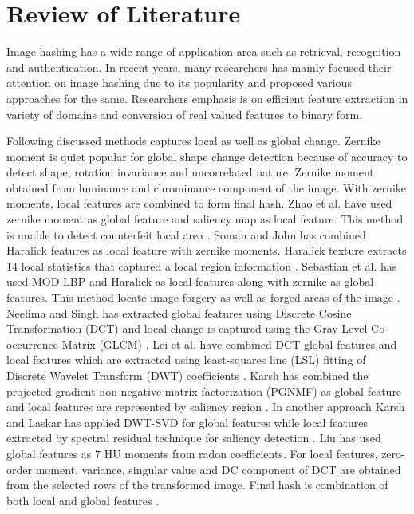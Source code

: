 \documentclass[12pt,a4paper]{jihmsp}
\begin{document}
{{	
\section{Review of Literature}
Image hashing has a wide range of application area such as retrieval, recognition and authentication. In recent years, many researchers has mainly focused their attention on image hashing due to its popularity and proposed various approaches for the same. Researchers emphasis is on efficient feature extraction in variety of domains and conversion of real valued features to  binary form.
\par
Following discussed methods captures local as well as global change. Zernike moment is quiet popular for global shape change detection because of accuracy to detect shape, rotation invariance and uncorrelated nature. Zernike moment obtained from luminance and chrominance component of the image. With zernike moments, local features are combined to form final hash. Zhao et al. have used zernike moment as global feature and saliency map as local feature. This method is unable to detect counterfeit local area \cite{zhao2013}. Soman and John has combined Haralick features as local feature with zernike moments. Haralick texture extracts 14 local statistics that captured a local region information \cite{soman2016}. Sebastian et al. has used MOD-LBP and Haralick as local features along with zernike as global features. This method locate image forgery as well as forged areas of the image \cite{sebastian2015}. Neelima and Singh has extracted global features using Discrete Cosine Transformation (DCT) and local change is captured using the Gray Level Co-occurrence Matrix (GLCM) \cite{neelima2015}. Lei et al. have combined DCT global features and local features which are extracted using least-squares line (LSL) fitting of Discrete Wavelet Transform (DWT) coefficients \cite{lei2010}. Karsh has combined the projected gradient non-negative matrix factorization (PGNMF) as global feature and local features are represented by saliency region \cite{karsh2016}. In another approach Karsh and Laskar has applied DWT-SVD for global features while local features extracted by spectral residual technique for saliency detection \cite{karsh2017}. Liu has used global features as $7$ HU moments from radon coefficients. For local features, zero-order moment, variance, singular value and DC component of DCT are obtained from the selected rows of the transformed image. Final hash is combination of both local and global features \cite{yuling2016}.
\par
}}
\end{document}
